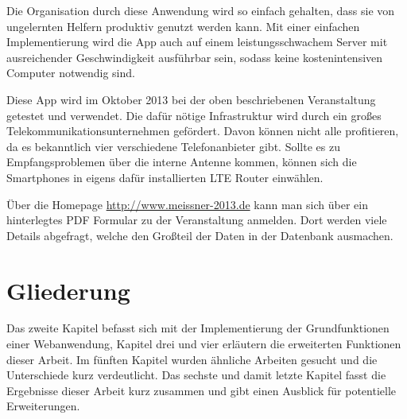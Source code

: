 Die Organisation durch diese Anwendung wird so einfach gehalten, dass sie von ungelernten Helfern produktiv genutzt werden kann. Mit einer einfachen Implementierung wird die App auch auf einem leistungsschwachem Server mit ausreichender Geschwindigkeit ausführbar sein, sodass keine kostenintensiven Computer notwendig sind.\par

Diese App wird im Oktober 2013 bei der oben beschriebenen Veranstaltung getestet und verwendet. Die dafür nötige Infrastruktur wird durch ein großes Telekommunikationsunternehmen gefördert. Davon können nicht alle profitieren, da es bekanntlich vier verschiedene Telefonanbieter gibt. Sollte es zu Empfangsproblemen über die interne Antenne kommen, können sich die Smartphones in eigens dafür installierten LTE Router einwählen.\par

Über die Homepage \url{http://www.meissner-2013.de} kann man sich über ein hinterlegtes PDF Formular zu der Veranstaltung anmelden. Dort werden viele Details abgefragt, welche den Großteil der Daten in der Datenbank ausmachen.

\section{Gliederung}
Das zweite Kapitel befasst sich mit der Implementierung der Grundfunktionen einer Webanwendung, Kapitel drei und vier erläutern die erweiterten Funktionen dieser Arbeit. Im fünften Kapitel wurden ähnliche Arbeiten gesucht und die Unterschiede kurz verdeutlicht. Das sechste und damit letzte Kapitel fasst die Ergebnisse dieser Arbeit kurz zusammen und gibt einen Ausblick für potentielle Erweiterungen. 